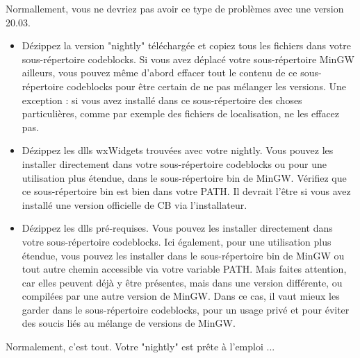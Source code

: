 Normallement, vous ne devriez pas avoir ce type de problèmes avec une version 20.03.
\begin{itemize}
\item Dézippez la version "nightly" téléchargée et copiez tous les fichiers dans votre sous-répertoire codeblocks. Si vous avez déplacé votre sous-répertoire MinGW ailleurs, vous pouvez même d'abord effacer tout le contenu de ce sous-répertoire codeblocks pour être certain de ne pas mélanger les versions. Une exception : si vous avez installé dans ce sous-répertoire des choses particulières, comme par exemple des fichiers de localisation, ne les effacez pas.
\item Dézippez les dlls wxWidgets trouvées avec votre nightly. Vous pouvez les installer directement dans votre sous-répertoire codeblocks ou pour une utilisation plus étendue, dans le sous-répertoire bin de MinGW. Vérifiez que ce sous-répertoire bin est bien dans votre PATH. Il devrait l'être si vous avez installé une version officielle de CB via l'installateur.
\item Dézippez les dlls pré-requises. Vous pouvez les installer directement dans votre sous-répertoire codeblocks. Ici également, pour une utilisation plus étendue, vous pouvez les installer dans le sous-répertoire bin de MinGW ou tout autre chemin accessible via votre variable PATH. Mais faites attention, car elles peuvent déjà y être présentes, mais dans une version différente, ou compilées par une autre version de MinGW. Dans ce cas, il vaut mieux les garder dans le sous-répertoire codeblocks, pour un usage privé et pour éviter des soucis liés au mélange de versions de MinGW.
\end{itemize}

Normalement, c'est tout. Votre "nightly" est prête à l'emploi ...
